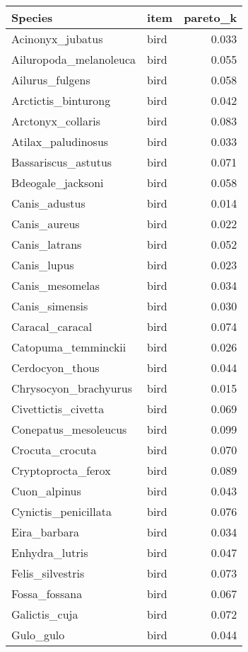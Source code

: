 \begin{table}
\centering
\begin{tabular}[t]{l|l|r}
\hline
Species & item & pareto\_k\\
\hline
Acinonyx\_jubatus & bird & 0.033\\
\hline
Ailuropoda\_melanoleuca & bird & 0.055\\
\hline
Ailurus\_fulgens & bird & 0.058\\
\hline
Arctictis\_binturong & bird & 0.042\\
\hline
Arctonyx\_collaris & bird & 0.083\\
\hline
Atilax\_paludinosus & bird & 0.033\\
\hline
Bassariscus\_astutus & bird & 0.071\\
\hline
Bdeogale\_jacksoni & bird & 0.058\\
\hline
Canis\_adustus & bird & 0.014\\
\hline
Canis\_aureus & bird & 0.022\\
\hline
Canis\_latrans & bird & 0.052\\
\hline
Canis\_lupus & bird & 0.023\\
\hline
Canis\_mesomelas & bird & 0.034\\
\hline
Canis\_simensis & bird & 0.030\\
\hline
Caracal\_caracal & bird & 0.074\\
\hline
Catopuma\_temminckii & bird & 0.026\\
\hline
Cerdocyon\_thous & bird & 0.044\\
\hline
Chrysocyon\_brachyurus & bird & 0.015\\
\hline
Civettictis\_civetta & bird & 0.069\\
\hline
Conepatus\_mesoleucus & bird & 0.099\\
\hline
Crocuta\_crocuta & bird & 0.070\\
\hline
Cryptoprocta\_ferox & bird & 0.089\\
\hline
Cuon\_alpinus & bird & 0.043\\
\hline
Cynictis\_penicillata & bird & 0.076\\
\hline
Eira\_barbara & bird & 0.034\\
\hline
Enhydra\_lutris & bird & 0.047\\
\hline
Felis\_silvestris & bird & 0.073\\
\hline
Fossa\_fossana & bird & 0.067\\
\hline
Galictis\_cuja & bird & 0.072\\
\hline
Gulo\_gulo & bird & 0.044\\

\end{tabular}
\end{table}
